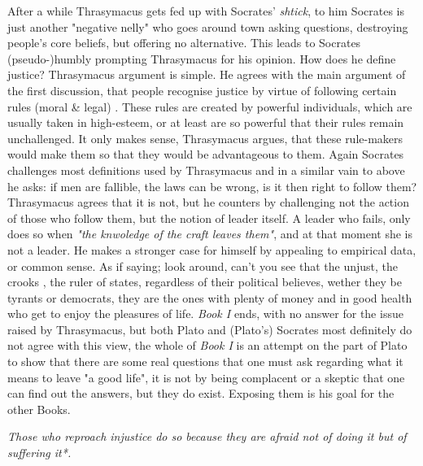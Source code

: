 \documentclass[english,course]{Notes}
\newcommand{\ita}[1]{\textit{#1}}
\newcommand\quo[1]{\begin{displayquote}\ita{\large{#1}}\end{displayquote}}
\begin{document}
{\par{After a while Thrasymacus gets fed up with Socrates' \ita{shtick}, to him Socrates is just another "negative nelly" who goes around town asking questions, destroying people's core beliefs, but offering no alternative. This leads to Socrates (pseudo-)humbly prompting Thrasymacus for his opinion. How does he define justice? Thrasymacus argument is simple. He agrees with the main argument of the first discussion, that people recognise justice by virtue of following certain rules (moral \& legal) . These rules are created by powerful individuals, which are usually taken in high-esteem, or at least are so powerful that their rules remain unchallenged. It only makes sense, Thrasymacus argues, that these rule-makers would make them so that they would be advantageous to them. Again Socrates challenges most definitions used by Thrasymacus and in a similar vain to above he asks: if men are fallible, the laws can be wrong, is it then right to follow them? Thrasymacus agrees that it is not, but he counters by challenging not the action of those who follow them, but the notion of leader itself. A leader who fails, only does so when \ita{"the knwoledge of the craft leaves them"}, and at that moment she is not a leader. He makes a stronger case for himself by appealing to empirical data, or common sense. As if saying; look around,  can't you see that the unjust, the crooks , the ruler of states, regardless of their political believes, wether they be tyrants or democrats, they are the ones with plenty of money and in good health who get to enjoy the pleasures of life. \ita{Book I} ends, with no answer for the issue raised by Thrasymacus, but both Plato and (Plato's) Socrates most definitely do not agree with this view, the whole of \ita{Book I} is an attempt on the part of Plato to show that there are some real questions that one must ask regarding what it means to leave "a good life", it is not by being complacent or a skeptic that one can find out the answers, but they do exist. Exposing them is his goal for the other Books.

\quo{Those who reproach injustice do so because they are afraid not of doing it but of suffering it*.}

}}
\end{document}
